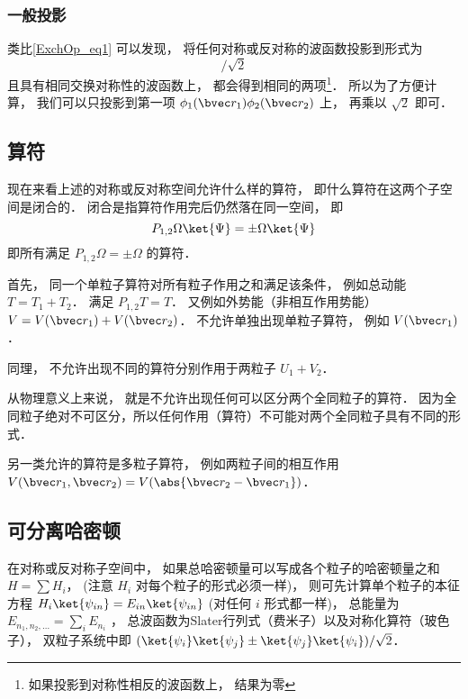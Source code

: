 \subsubsection{一般投影}
类比\autoref{ExchOp_eq1} 可以发现， 将任何对称或反对称的波函数投影到形式为
\begin{equation}
[\phi_1(\bvec r_1)\phi_2(\bvec r_2) \pm \phi_2(\bvec r_1)\phi_1(\bvec r_2)]/\sqrt{2}
\end{equation}
且具有相同交换对称性的波函数上， 都会得到相同的两项\footnote{如果投影到对称性相反的波函数上， 结果为零}． 所以为了方便计算， 我们可以只投影到第一项 $\phi_1(\bvec r_1)\phi_2(\bvec r_2)$ 上， 再乘以 $\sqrt{2}$ 即可．

\subsection{算符}
现在来看上述的对称或反对称空间允许什么样的算符， 即什么算符在这两个子空间是闭合的． 闭合是指算符作用完后仍然落在同一空间， 即
\begin{equation}
P_{1,2}\Omega\ket{\Psi} = \pm \Omega \ket{\Psi}
\end{equation}
即所有满足 $P_{1,2}\Omega = \pm \Omega$ 的算符．

首先， 同一个单粒子算符对所有粒子作用之和满足该条件， 例如总动能 $T = T_1 + T_2$． 满足 $P_{1,2}T = T$． 又例如外势能（非相互作用势能） $V = V(\bvec r_1) + V(\bvec r_2)$． 不允许单独出现单粒子算符， 例如 $V(\bvec r_1)$．

同理， 不允许出现不同的算符分别作用于两粒子 $U_1 + V_2$．

从物理意义上来说， 就是不允许出现任何可以区分两个全同粒子的算符． 因为全同粒子绝对不可区分，所以任何作用（算符）不可能对两个全同粒子具有不同的形式．

另一类允许的算符是多粒子算符， 例如两粒子间的相互作用 $V(\bvec r_1, \bvec r_2) = V(\abs{\bvec r_2 - \bvec r_1})$．

\subsection{可分离哈密顿}
在对称或反对称子空间中， 如果总哈密顿量可以写成各个粒子的哈密顿量之和 $H = \sum H_i$， (注意 $H_i$ 对每个粒子的形式必须一样)， 则可先计算单个粒子的本征方程 $H_i \ket{\psi_{in}} = E_{in}\ket{\psi_{in}}$ (对任何 $i$ 形式都一样)， 总能量为 $E_{n_1,n_2,\dots} = \sum_i E_{n_i}$ ， 总波函数为Slater行列式（费米子）以及对称化算符（玻色子）， 双粒子系统中即 $(\ket{\psi_i}\ket{\psi_j} \pm \ket{\psi_j}\ket{\psi_i})/\sqrt{2}$．

